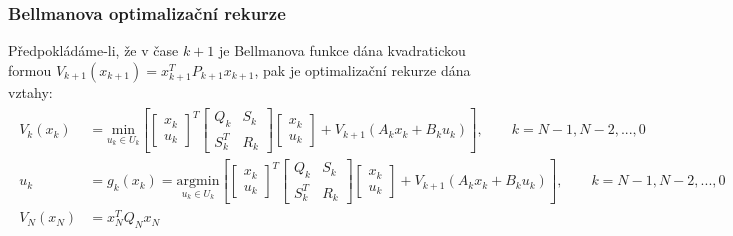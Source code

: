 \subsubsection*{Bellmanova optimalizační rekurze}
Předpokládáme-li, že v čase $ k+1 $ je Bellmanova funkce dána kvadratickou formou $ V_{k+1}(x_{k+1}) = x_{k+1}^T P_{k+1} x_{k+1} $, pak je optimalizační rekurze dána vztahy:
\begin{align*}
\begin{split}
V_k(x_k) &= \underset{u_k \in U_k}{\mathrm{min}} \left[ \begin{bmatrix} x_k \\ u_k \end{bmatrix}^T \begin{bmatrix} Q_k & S_k \\ S_k^T & R_k \end{bmatrix} \begin{bmatrix} x_k \\ u_k \end{bmatrix} + V_{k+1}(A_k x_k + B_k u_k) \right], \qquad k= N-1, N-2, ..., 0 \\
u_k &= g_k(x_k) = \underset{u_k \in U_k}{\mathrm{argmin}} \left[ \begin{bmatrix} x_k \\ u_k \end{bmatrix}^T \begin{bmatrix} Q_k & S_k \\ S_k^T & R_k \end{bmatrix} \begin{bmatrix} x_k \\ u_k \end{bmatrix} + V_{k+1}(A_k x_k + B_k u_k) \right], \qquad k= N-1, N-2, ..., 0 \\
V_N(x_N) &= x_N^T Q_N x_N
\end{split}
\end{align*}

